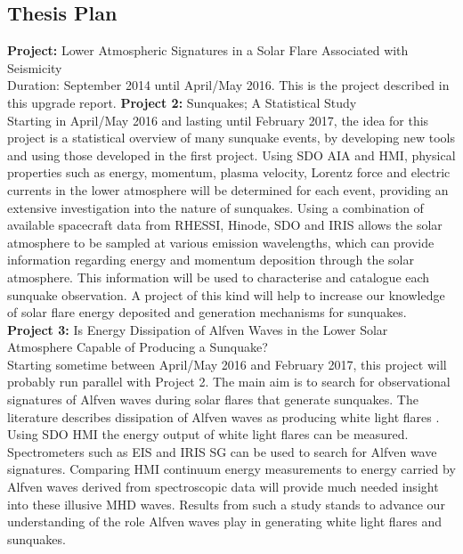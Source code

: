 \subsection{Thesis Plan}\label{thesisplan}
\noindent
\textbf{Project:} Lower Atmospheric Signatures in a Solar Flare Associated with Seismicity\\
Duration: September 2014 until April/May 2016. This is the project described in this upgrade report.
\noindent
\textbf{Project 2:} Sunquakes; A Statistical Study\\
Starting in April/May 2016 and lasting until February 2017, the idea for this project is a statistical overview of many sunquake events, by developing new tools and using those developed in the first project. Using SDO AIA and HMI, physical properties such as energy, momentum, plasma velocity, Lorentz force and electric currents in the lower atmosphere will be determined for each event, providing an extensive investigation into the nature of sunquakes. Using a combination of available spacecraft data from RHESSI, Hinode, SDO and IRIS allows the solar atmosphere to be sampled at various emission wavelengths, which can provide information regarding energy and momentum deposition through the solar atmosphere. This information will be used to characterise and catalogue each sunquake observation. A project of this kind will help to increase our knowledge of solar flare energy deposited and generation mechanisms for sunquakes.\\
\noindent
\textbf{Project 3:} Is Energy Dissipation of Alfven Waves in the Lower Solar Atmosphere Capable of Producing a Sunquake? \\
Starting sometime between April/May 2016 and February 2017, this project will probably run parallel with Project 2. The main aim is to search for observational signatures of Alfven waves during solar flares that generate sunquakes. The literature describes dissipation of Alfven waves as producing white light flares \citep{1982SoPh...80...99E, 2013AGUFMSH51A2091F}. Using SDO HMI the energy output of white light flares can be measured. Spectrometers such as EIS and IRIS SG can be used to search for Alfven wave signatures. Comparing HMI continuum energy measurements to energy carried by Alfven waves derived from spectroscopic data will provide much needed insight into these illusive MHD waves. Results from such a study stands to advance our understanding of the role Alfven waves play in generating white light flares and sunquakes.   




